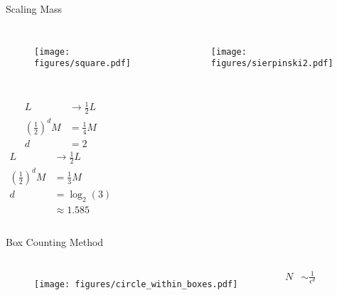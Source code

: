 \documentclass[10pt]{beamer}
\begin{document}
\begin{frame}{Scaling Mass}
    \begin{columns}[c]
        \column{1.5in}
        \begin{figure}[h!]
            \centering
            \texttt{[image: figures/square.pdf]}
        \end{figure}
    \column{1.5in}
        \begin{figure}[h!]
            \centering
            \texttt{[image: figures/sierpinski2.pdf]}
        \end{figure}
    \end{columns}
    \begin{columns}[c]
        \column{1.5in}
            \begin{align*}
                L &\rightarrow \frac{1}{2} L \\
                \left (\frac{1}{2} \right )^d M &= \frac{1}{4} M \\
                d &= 2
            \end{align*}
        \column{1.5in}
            \begin{align*}
                L &\rightarrow \frac{1}{2} L \\
                \left (\frac{1}{2} \right )^d M &= \frac{1}{3} M \\
                d &= \log_2 (3) \\ &\approx 1.585
            \end{align*}
    \end{columns}
\end{frame}

\begin{frame}{Box Counting Method}
    \begin{columns}[c]
        \column{1.5in}
        \begin{figure}[h!]
            \centering
            \texttt{[image: figures/circle\_within\_boxes.pdf]}
        \end{figure}
        \column{1.5in}
            \begin{align*}
                N &\sim \frac{1}{\epsilon^d} \\
            \end{align*}
    \end{columns}
\end{frame}
\end{document}
